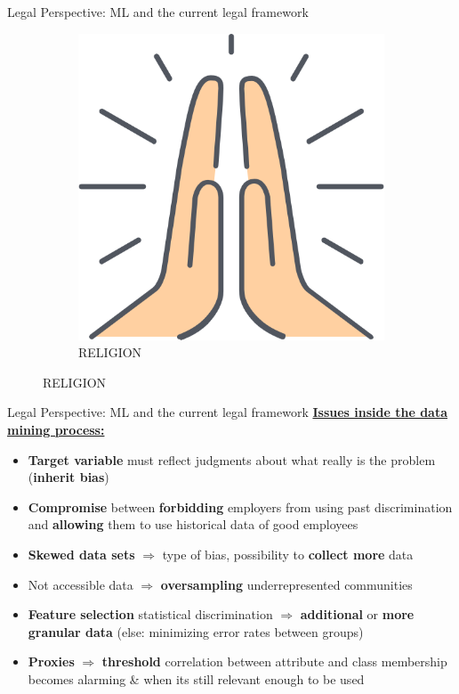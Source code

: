 \begin{frame}{Legal Perspective: ML and the current legal framework \cite{Singh, automatedDsicrimination}}
\begin{figure}
\begin{subfigure}{.165\textwidth}
        \end{subfigure}%
        \begin{subfigure}{.165\textwidth}
            \centering
            \includegraphics[width=.4\linewidth]{presentation/assets/religion.png}
            \caption{RELIGION}
            \label{fig:sub6}
        \end{subfigure}%
    \end{figure}
\end{frame}


\begin{frame}{Legal Perspective: ML and the current legal framework \cite{Barocas.2016}}
    \underline{\textbf{Issues inside the data mining process:}}\\
    \begin{itemize}
        \item \textbf{Target variable} must reflect judgments about what really is the problem (\textbf{inherit bias})
        \item \textbf{Compromise} between \textbf{forbidding} employers from using past discrimination and \textbf{allowing} them to use historical data of good employees
        \item \textbf{Skewed data sets} $\Rightarrow$ type of bias, possibility to \textbf{collect more} data
        \item Not accessible data $\Rightarrow$ \textbf{oversampling} underrepresented communities
        \item \textbf{Feature selection} statistical discrimination $\Rightarrow$ \textbf{additional} or \textbf{more granular data} (else: minimizing error rates between groups)
        \item \textbf{Proxies} $\Rightarrow$ \textbf{threshold} correlation between attribute and class membership becomes alarming \& when its still relevant enough to be used
    \end{itemize}
\end{frame}